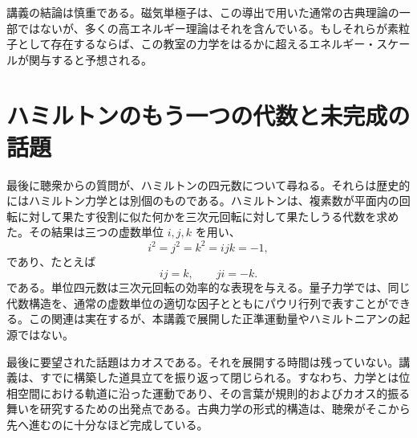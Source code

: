 \begin{classroomqa}
\end{classroomqa}

講義の結論は慎重である。磁気単極子は、この導出で用いた通常の古典理論の一部ではないが、多くの高エネルギー理論はそれを含んでいる。もしそれらが素粒子として存在するならば、この教室の力学をはるかに超えるエネルギー・スケールが関与すると予想される。

\section{ハミルトンのもう一つの代数と未完成の話題}

最後に聴衆からの質問が、ハミルトンの四元数について尋ねる。それらは歴史的にはハミルトン力学とは別個のものである。ハミルトンは、複素数が平面内の回転に対して果たす役割に似た何かを三次元回転に対して果たしうる代数を求めた。その結果は三つの虚数単位 \(i,j,k\) を用い、
\begin{equation}
  i^2=j^2=k^2=ijk=-1,
\end{equation}
であり、たとえば
\begin{equation}
  ij=k,
  \qquad
  ji=-k.
\end{equation}
である。単位四元数は三次元回転の効率的な表現を与える。量子力学では、同じ代数構造を、通常の虚数単位の適切な因子とともにパウリ行列で表すことができる。この関連は実在するが、本講義で展開した正準運動量やハミルトニアンの起源ではない。

最後に要望された話題はカオスである。それを展開する時間は残っていない。講義は、すでに構築した道具立てを振り返って閉じられる。すなわち、力学とは位相空間における軌道に沿った運動であり、その言葉が規則的およびカオス的振る舞いを研究するための出発点である。古典力学の形式的構造は、聴衆がそこから先へ進むのに十分なほど完成している。
